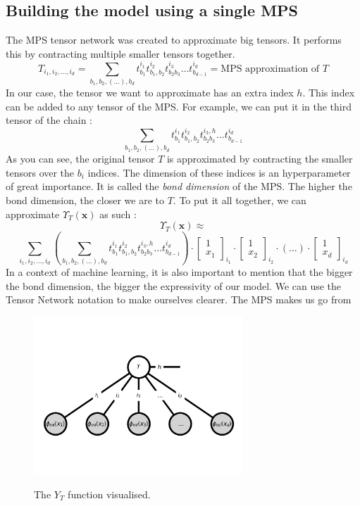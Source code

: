 \documentclass{article}
\theoremstyle{definition}
\theoremstyle{definition}
\begin{document}
\subsection{Building the model using a single MPS}
The MPS tensor network was created to approximate big tensors. It performs this by contracting multiple smaller tensors together.
\begin{equation} \label{eq:mps_approx}
T_{i_1, i_2, \dots, i_d} 
= 
\sum_{b_1,b_2,(\dots), b_d} t^{i_1}_{b_1} t^{i_2}_{b_1, b_2} t^{i_3}_{b_2 b_3} \dots  t^{i_d}_{ b_{d-1} } 
= \text{MPS approximation of $T$}
\end{equation}
In our case, the tensor we want to approximate has an extra index $h$. This index can be added to any tensor of the MPS. For example, we can put it in the third tensor of the chain :
\[
    \sum_{b_1,b_2,(\dots), b_d} t^{i_1}_{b_1} t^{i_2}_{b_1, b_2} t^{i_3, h}_{b_2 b_3} \dots  t^{i_d}_{ b_{d-1} } 
\]
As you can see, the original tensor $T$ is approximated by contracting the smaller tensors over the $b_i$ indices. The dimension of these indices is an hyperparameter of great importance. It is called the \emph{bond dimension} of the MPS. The higher the bond dimension, the closer we are to $T$. To put it all together, we can approximate $\Upsilon_T(\mathbf{x})$ as such :
\[
    \Upsilon_T(\mathbf{x}) \approx
\]
\[
    \sum_{i_1, i_2, \dots, i_d}
    \left(
    \sum_{b_1,b_2,(\dots), b_d} t^{i_1}_{b_1} t^{i_2}_{b_1, b_2} t^{i_3, h}_{b_2 b_3} \dots  t^{i_d}_{ b_{d-1} } 
    \right)
    \cdot
    \begin{bmatrix}
        1 \\ x_1
    \end{bmatrix}_{i_1}
    \cdot
    \begin{bmatrix}
        1 \\ x_2
    \end{bmatrix}_{i_2}
    \cdot
    (\dots)
    \cdot
    \begin{bmatrix}
        1 \\ x_d
    \end{bmatrix}_{i_d}
\]
In a context of machine learning, it is also important to mention that the bigger the bond dimension, the bigger the expressivity of our model. We can use the Tensor Network notation to make ourselves clearer. 
The MPS makes us go from 
\begin{figure}[hbt!]
    \centering
    \caption{The $Y_T$ function visualised.}
    \includegraphics[width=0.7\textwidth]{images/2023-04-20-11-02-45.png}
    \label{fig:full_tensor_model}
\end{figure}
\end{document}
